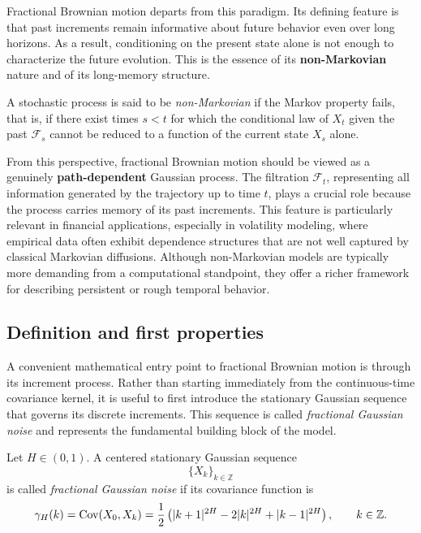 Fractional Brownian motion departs from this paradigm. Its defining feature is that past increments remain informative about future behavior even over long horizons. As a result, conditioning on the present state alone is not enough to characterize the future evolution. This is the essence of its \textbf{non-Markovian} nature and of its long-memory structure.

\begin{definition}
A stochastic process is said to be \emph{non-Markovian} if the Markov property fails, that is, if there exist times \(s<t\) for which the conditional law of \(X_t\) given the past \(\mathcal{F}_s\) cannot be reduced to a function of the current state \(X_s\) alone.
\end{definition}

From this perspective, fractional Brownian motion should be viewed as a genuinely \textbf{path-dependent} Gaussian process. The filtration \(\mathcal{F}_t\), representing all information generated by the trajectory up to time \(t\), plays a crucial role because the process carries memory of its past increments. This feature is particularly relevant in financial applications, especially in volatility modeling, where empirical data often exhibit dependence structures that are not well captured by classical Markovian diffusions. Although non-Markovian models are typically more demanding from a computational standpoint, they offer a richer framework for describing persistent or rough temporal behavior.

\subsection{Definition and first properties}

A convenient mathematical entry point to fractional Brownian motion is through its increment process. Rather than starting immediately from the continuous-time covariance kernel, it is useful to first introduce the stationary Gaussian sequence that governs its discrete increments. This sequence is called \emph{fractional Gaussian noise} and represents the fundamental building block of the model.

\begin{definition}
Let \(H\in(0,1)\). A centered stationary Gaussian sequence
\[
\{X_k\}_{k\in\mathbb{Z}}
\]
is called \emph{fractional Gaussian noise} if its covariance function is
\[
\gamma_H(k)
=
\operatorname{Cov}(X_0,X_k)
=
\frac{1}{2}
\left(
|k+1|^{2H}
-
2|k|^{2H}
+
|k-1|^{2H}
\right),
\qquad k\in\mathbb{Z}.
\]
\end{definition}

